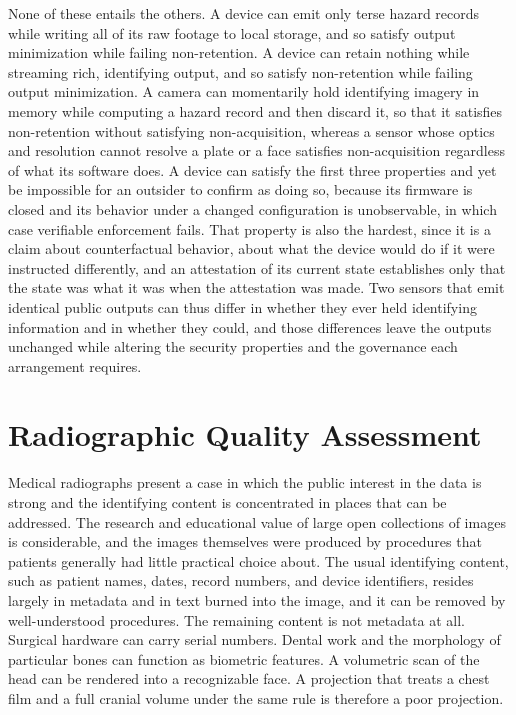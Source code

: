 \documentclass[11pt]{article}
\theoremstyle{definition}
\begin{document}
None of these entails the others. A device can emit only terse hazard records while writing all of its raw footage to local storage, and so satisfy output minimization while failing non-retention. A device can retain nothing while streaming rich, identifying output, and so satisfy non-retention while failing output minimization. A camera can momentarily hold identifying imagery in memory while computing a hazard record and then discard it, so that it satisfies non-retention without satisfying non-acquisition, whereas a sensor whose optics and resolution cannot resolve a plate or a face satisfies non-acquisition regardless of what its software does. A device can satisfy the first three properties and yet be impossible for an outsider to confirm as doing so, because its firmware is closed and its behavior under a changed configuration is unobservable, in which case verifiable enforcement fails. That property is also the hardest, since it is a claim about counterfactual behavior, about what the device would do if it were instructed differently, and an attestation of its current state establishes only that the state was what it was when the attestation was made. Two sensors that emit identical public outputs can thus differ in whether they ever held identifying information and in whether they could, and those differences leave the outputs unchanged while altering the security properties and the governance each arrangement requires.

\section{Radiographic Quality Assessment}

Medical radiographs present a case in which the public interest in the data is strong and the identifying content is concentrated in places that can be addressed. The research and educational value of large open collections of images is considerable, and the images themselves were produced by procedures that patients generally had little practical choice about. The usual identifying content, such as patient names, dates, record numbers, and device identifiers, resides largely in metadata and in text burned into the image, and it can be removed by well-understood procedures. The remaining content is not metadata at all. Surgical hardware can carry serial numbers. Dental work and the morphology of particular bones can function as biometric features. A volumetric scan of the head can be rendered into a recognizable face. A projection that treats a chest film and a full cranial volume under the same rule is therefore a poor projection.
\end{document}

